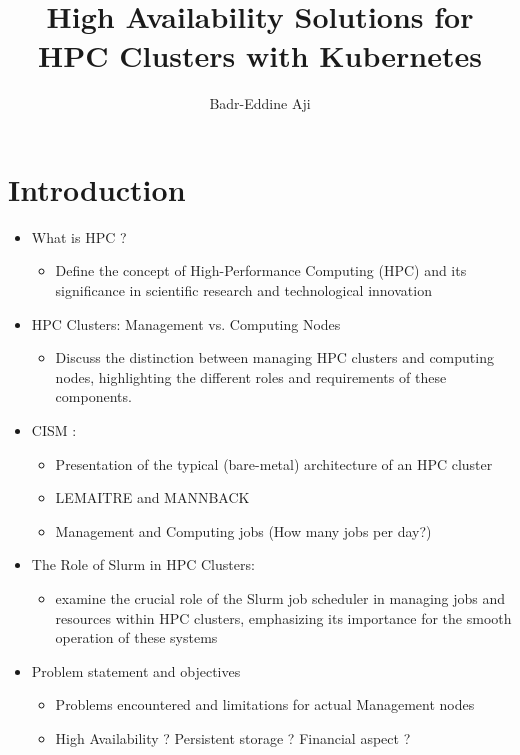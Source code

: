 \documentclass{article}
\title{High Availability Solutions for HPC Clusters with Kubernetes}
\author{ Badr-Eddine Aji}
\date{}
\begin{document}
\maketitle

\section{Introduction}
\begin{itemize}
    \item What is HPC ?
     
\begin{itemize}
    \item  Define the concept of High-Performance Computing (HPC) and its significance in scientific research and technological innovation

\end{itemize}
    \item HPC Clusters: Management vs. Computing Nodes
\begin{itemize}
    \item   Discuss the distinction between managing HPC clusters and computing nodes, highlighting the different roles and requirements of these components.

\end{itemize}
    
    \item CISM :
        \begin{itemize}

            \item Presentation of the typical (bare-metal) architecture of an HPC cluster
            \item LEMAITRE and MANNBACK
            \item Management and Computing jobs (How many jobs per day?)

        \end{itemize}
    

    \item The Role of Slurm in HPC Clusters:
            \begin{itemize}
            \item examine the crucial role of the Slurm job scheduler in managing jobs and resources within HPC clusters, emphasizing its importance for the smooth operation of these systems
        \end{itemize}
     \item Problem statement and objectives
        \begin{itemize}
            \item Problems encountered and limitations for actual Management nodes
            \item High Availability ? Persistent storage ? Financial aspect ?
        \end{itemize}
        

\end{itemize}
\end{document}
